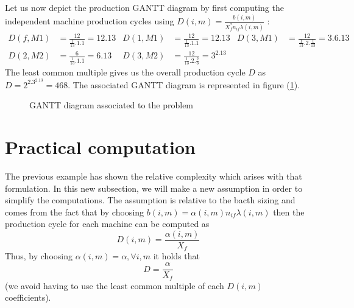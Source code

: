 Let us now depict the production GANTT diagram by first computing the independent machine production cycles using $D(i,m) = \frac{b(i,m)}{X_f^*n_{if}\lambda(i,m)}$ : 
\begin{align*}
    D(f, M1) &= \frac{12}{\frac{1}{13}.1.1} = 12.13 &
    D(1, M1) &= \frac{12}{\frac{1}{13}.1.1} = 12.13 &
    D(3, M1) &= \frac{12}{\frac{1}{13}.2.\frac{1}{13}} = 3.6.13 \\
    D(2, M2) &= \frac{6}{\frac{1}{13}.1.1} = 6.13 &
    D(3, M2) &= \frac{12}{\frac{1}{13}.2.\frac{2}{3}} = 3^2.13
\end{align*}
The least common multiple gives us the overall production cycle $D$ as $D=2^2.3^2.13=468$. The associated GANTT diagram is represented in figure (\ref{shared_res:gantt1}).

\begin{figure}[h!]
    \centering
    \caption{\label{shared_res:gantt1}GANTT diagram associated to the problem}
\end{figure}

\section{Practical computation}

The previous example has shown the relative complexity which arises with that formulation. In this new subsection, we will make a new assumption in order to simplify the computations. The assumption is relative to the bacth sizing and comes from the fact that by choosing $b(i,m) = \alpha(i,m)n_{if}\lambda(i,m)$ then the production cycle for each machine can be computed as \[ D(i,m) = \frac{\alpha(i,m)}{X_f} \] Thus, by choosing $\alpha(i,m)=\alpha,\forall i,m$ it holds that \[ D = \frac{\alpha}{X_f} \] (we avoid having to use the least common multiple of each $D(i,m)$ coefficients). 

